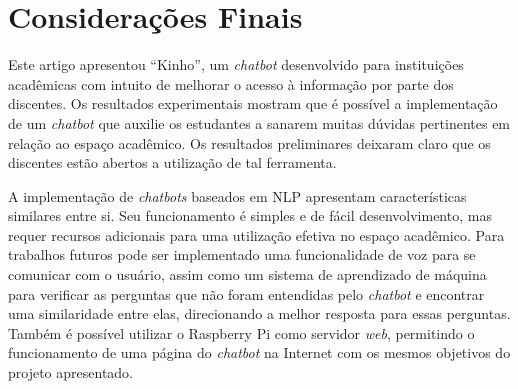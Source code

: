 \documentclass[12pt]{article}
\begin{document}
\section{Considerações Finais} 

Este artigo apresentou “Kinho”, um {\itshape chatbot} desenvolvido para instituições acadêmicas com intuito de melhorar o acesso à informação por parte dos discentes. Os resultados experimentais mostram que é possível a implementação de um {\itshape chatbot} que auxilie os estudantes a sanarem muitas dúvidas pertinentes em relação ao espaço acadêmico. Os resultados preliminares deixaram claro que os discentes estão abertos a utilização de tal ferramenta.

A implementação de {\itshape chatbots} baseados em NLP apresentam características similares entre si. Seu funcionamento é simples e de fácil desenvolvimento, mas requer recursos adicionais para uma utilização efetiva no espaço acadêmico. Para trabalhos futuros pode ser implementado uma funcionalidade de voz para se comunicar com o usuário, assim como um sistema de aprendizado de máquina para verificar as perguntas que não foram entendidas pelo {\itshape chatbot} e encontrar uma similaridade entre elas, direcionando a melhor resposta para essas perguntas. Também é possível utilizar o Raspberry Pi como servidor {\itshape web}, permitindo o funcionamento de uma página do {\itshape chatbot} na Internet com os mesmos objetivos do projeto apresentado.



\end{document}
